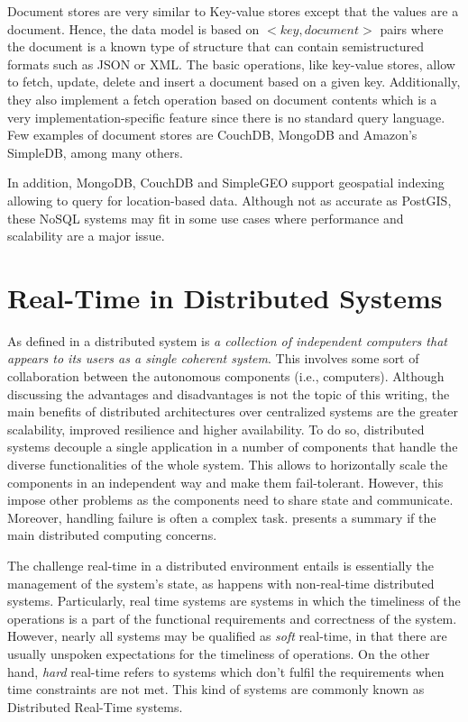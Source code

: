 Document stores are very similar to Key-value stores except that the values are a document. Hence, the data model is based on ${<key, document>}$ pairs where the document is a known type of structure that can contain semistructured formats such as JSON or XML. The basic operations, like key-value stores, allow to fetch, update, delete and insert a document based on a given key. Additionally, they also implement a fetch operation based on document contents which is a very implementation-specific feature since there is no standard query language. Few examples of document stores are CouchDB, MongoDB and Amazon's SimpleDB, among many others.  

In addition, MongoDB, CouchDB and SimpleGEO support geospatial indexing allowing to query for location-based data. Although not as accurate as PostGIS, these NoSQL systems may fit in some use cases where performance and scalability are a major issue.


\section{Real-Time in Distributed Systems}

As defined in \cite{distributed-systems-book} a distributed system is \textit{a collection of independent computers that appears to its users as a single coherent system}. This involves some sort of collaboration between the autonomous components (i.e., computers). Although discussing the advantages and disadvantages is not the topic of this writing, the main benefits of distributed architectures over centralized systems are the greater scalability, improved resilience and higher availability. To do so, distributed systems decouple a single application in a number of components that handle the diverse functionalities of the whole system. This allows to horizontally scale the components in an independent way and make them fail-tolerant. However, this impose other problems as the components need to share state and communicate. Moreover, handling failure is often a complex task. \cite{} presents a summary if the main distributed computing concerns.

The challenge real-time in a distributed environment entails is essentially the management of the system's state, as happens with non-real-time distributed systems. Particularly, real time systems are systems in which the timeliness of the operations is a part of the functional requirements and correctness of the system. However, nearly all systems may be qualified as \textit{soft} real-time, in that there are usually unspoken expectations for the timeliness of operations. On the other hand, \textit{hard} real-time refers to systems which don't fulfil the requirements when time constraints are not met. This kind of systems are commonly known as Distributed Real-Time systems.

